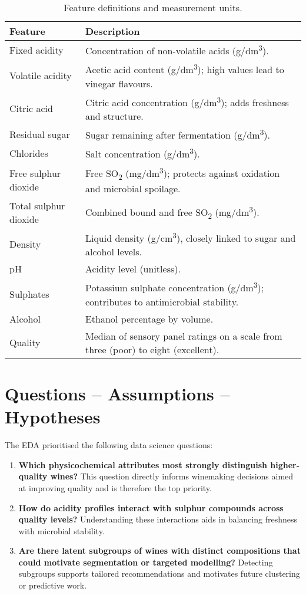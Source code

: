 \documentclass[11pt]{article}
\begin{document}
\begin{table}[H]
  \centering
  \caption{Feature definitions and measurement units.}
  \label{tab:feature-definitions}
  \begin{tabular}{p{}p{}}
    \toprule
    \textbf{Feature} & \textbf{Description} \\
    \midrule
    Fixed acidity & Concentration of non-volatile acids (g/dm\textsuperscript{3}). \\
    Volatile acidity & Acetic acid content (g/dm\textsuperscript{3}); high values lead to vinegar flavours. \\
    Citric acid & Citric acid concentration (g/dm\textsuperscript{3}); adds freshness and structure. \\
    Residual sugar & Sugar remaining after fermentation (g/dm\textsuperscript{3}). \\
    Chlorides & Salt concentration (g/dm\textsuperscript{3}). \\
    Free sulphur dioxide & Free SO\textsubscript{2} (mg/dm\textsuperscript{3}); protects against oxidation and microbial spoilage. \\
    Total sulphur dioxide & Combined bound and free SO\textsubscript{2} (mg/dm\textsuperscript{3}). \\
    Density & Liquid density (g/cm\textsuperscript{3}), closely linked to sugar and alcohol levels. \\
    pH & Acidity level (unitless). \\
    Sulphates & Potassium sulphate concentration (g/dm\textsuperscript{3}); contributes to antimicrobial stability. \\
    Alcohol & Ethanol percentage by volume. \\
    Quality & Median of sensory panel ratings on a scale from three (poor) to eight (excellent). \\
    \bottomrule
  \end{tabular}
\end{table}

\section{Questions -- Assumptions -- Hypotheses}
The EDA prioritised the following data science questions:
\begin{enumerate}
  \item \textbf{Which physicochemical attributes most strongly distinguish higher-quality wines?} This question directly informs winemaking decisions aimed at improving quality and is therefore the top priority.
  \item \textbf{How do acidity profiles interact with sulphur compounds across quality levels?} Understanding these interactions aids in balancing freshness with microbial stability.
  \item \textbf{Are there latent subgroups of wines with distinct compositions that could motivate segmentation or targeted modelling?} Detecting subgroups supports tailored recommendations and motivates future clustering or predictive work.
\end{enumerate}
\end{document}
